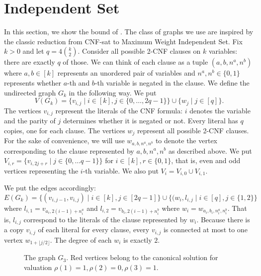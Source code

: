 \section{Independent Set}
\label{sec:mwis}

In this section, we show the bound of . The class of graphs we use are inspired by the classic reduction from CNF-sat to Maximum Weight Independent Set.
Fix $k > 0$ and let $q = 4\binom{k}{2}$. Consider all possible 2-CNF clauses on $k$ variables: there are exactly $q$ of those. We can think of each clause as a tuple $(a, b, n^a, n^b)$ where $a, b \in [k]$ represents an unordered pair of variables and $n^a, n^b \in \{0, 1\}$ represents whether $a$-th and $b$-th variable is negated in the clause. We define the undirected graph $G_k$ in the following way. We put
\begin{equation*}
    V(G_k) = \{v_{i,j} \mid i \in [k], j \in \{0, \dots, 2q - 1\}\} \cup
             \{ w_j \mid j \in [q] \}.
\end{equation*}
The vertices $v_{i,j}$ represent the literals of the CNF formula: $i$ denotes the variable and the parity of $j$ determines whether it is negated or not.
Every literal has $q$ copies, one for each clause. The vertices $w_j$ represent all possible 2-CNF clauses. For the sake of convenience, we will use $w_{a,b,n^a,n^b}$ to denote the vertex corresponding to the clause represented by $a,b,n^a,n^b$ as described above. We put $V_{i,r} = \{ v_{i, 2j + r} \mid j \in \{0, \dots q - 1\} \}$ for $i \in [k], r \in \{0, 1\}$, that is, even and odd vertices representing the $i$-th variable. We also put $V_i = V_{i,0} \cup V_{i,1}$.

We put the edges accordingly:
\begin{equation*}
    E(G_k) = \{ (v_{i,j-1}, v_{i,j}) \mid i \in [k], j \in [2q - 1]\} \cup
             \{ (w_i, l_{i,j} \mid i \in [q], j \in \{1, 2\} \}
\end{equation*}
where $l_{i,1} = v_{a_i, 2(i - 1) + n^a_i}$ and $l_{i,2} = v_{b_i, 2(i - 1) + n^b_i}$ where $w_i = w_{a_i, b_i, n^a_i, n^b_i}$. That is, $l_{i,j}$ correspond to the literals of the clause represented by $w_i$. Because there is a copy $v_{i,j}$ of each literal for every clause, every $v_{i,j}$ is connected at most to one vertex $w_{1 + \lfloor j/2 \rfloor}$. The degree of each $w_i$ is exactly $2$.

\begin{figure}[h]
    \centering
    \label{fig:mwis}
    
    \caption{The graph $G_3$. Red vertices belong to the canonical solution for valuation $\rho(1) = 1, \rho(2) = 0, \rho(3) = 1$.}
\end{figure}

